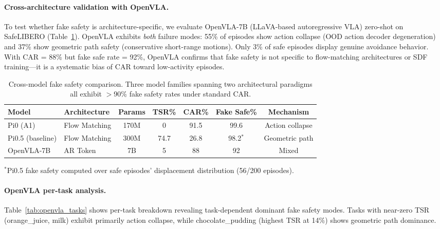 \documentclass[letterpaper]{article}
\begin{document}
\paragraph{Cross-architecture validation with OpenVLA.}
To test whether fake safety is architecture-specific, we evaluate OpenVLA-7B (LLaVA-based autoregressive VLA) zero-shot on SafeLIBERO (Table~\ref{tab:cross_model}). OpenVLA exhibits \emph{both} failure modes: 55\% of episodes show action collapse (OOD action decoder degeneration) and 37\% show geometric path safety (conservative short-range motions). Only 3\% of safe episodes display genuine avoidance behavior. With CAR = 88\% but fake safe rate = 92\%, OpenVLA confirms that fake safety is not specific to flow-matching architectures or SDF training---it is a systematic bias of CAR toward low-activity episodes.

\begin{table}[h]
\centering
\caption{Cross-model fake safety comparison. Three model families spanning two architectural paradigms all exhibit $>$90\% fake safety rates under standard CAR.}
\label{tab:cross_model}
\begin{tabular}{llccccc}
\toprule
\textbf{Model} & \textbf{Architecture} & \textbf{Params} & \textbf{TSR\%} & \textbf{CAR\%} & \textbf{Fake Safe\%} & \textbf{Mechanism} \\
\midrule
Pi0 (A1) & Flow Matching & 170M & 0 & 91.5 & 99.6 & Action collapse \\
Pi0.5 (baseline) & Flow Matching & 300M & 74.7 & 26.8 & 98.2$^*$ & Geometric path \\
OpenVLA-7B & AR Token & 7B & 5 & 88 & 92 & Mixed \\
\bottomrule
\end{tabular}
\vspace{2pt}
{\small $^*$Pi0.5 fake safety computed over safe episodes' displacement distribution (56/200 episodes).}
\end{table}

\paragraph{OpenVLA per-task analysis.}
Table~\ref{tab:openvla_tasks} shows per-task breakdown revealing task-dependent dominant fake safety modes. Tasks with near-zero TSR (orange\_juice, milk) exhibit primarily action collapse, while chocolate\_pudding (highest TSR at 14\%) shows geometric path dominance.
\end{document}
